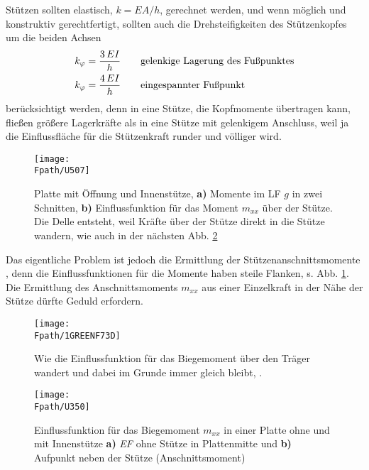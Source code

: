 St\"{u}tzen sollten elastisch, $k = EA/h$, gerechnet werden, und wenn m\"{o}glich und konstruktiv gerechtfertigt, sollten auch die Drehsteifigkeiten des St\"{u}tzenkopfes um die beiden Achsen
\begin{align}
k_\varphi &= \frac{3\,EI}{h}\qquad \mbox{gelenkige Lagerung des Fu{\ss}punktes} \\
k_\varphi &= \frac{4\,EI}{h}\qquad \mbox{eingespannter Fu{\ss}punkt}
\end{align}
ber\"{u}cksichtigt werden, denn in eine St\"{u}tze, die Kopfmomente \"{u}bertragen kann, flie{\ss}en gr\"{o}{\ss}ere Lagerkr\"{a}fte als in eine St\"{u}tze mit gelenkigem Anschluss, weil ja die Einflussfl\"{a}che f\"{u}r die St\"{u}tzenkraft runder und v\"{o}lliger wird.
\begin{figure}[tbp]
\centering
\if {} \sidecaption \fi
\texttt{[image: \\Fpath/U507]}
\caption{Platte mit \"{O}ffnung und Innenst\"{u}tze, \textbf{ a)} Momente im LF $g$ in zwei Schnitten, \textbf{ b)}  Einflussfunktion f\"{u}r das Moment $m_{xx}$ \"{u}ber der St\"{u}tze. Die \glq Delle\grq{} entsteht, weil Kr\"{a}fte \"{u}ber der St\"{u}tze direkt in die St\"{u}tze wandern, wie auch in der n\"{a}chsten Abb. \ref{1GreenF73} } \label{U507}
\end{figure}%

Das eigentliche Problem ist jedoch die Ermittlung der St\"{u}tzenanschnittsmomente , denn die Einflussfunktionen f\"{u}r die Momente haben steile Flanken, s. Abb. \ref{U507}. Die Ermittlung des Anschnittsmoments $m_{xx}$ aus einer Einzelkraft in der N\"{a}he der St\"{u}tze d\"{u}rfte Geduld erfordern.

\begin{figure}[tbp]
\centering
\texttt{[image: \\Fpath/1GREENF73D]}
\caption{Wie die Einflussfunktion f\"{u}r das Biegemoment \"{u}ber den Tr\"{a}ger wandert und dabei im Grunde immer gleich bleibt, \cite{Ha6}.}
\label{1GreenF73}%
\end{figure}%
\begin{figure}
\centering
\if {} \sidecaption[t] \fi
{\texttt{[image: \\Fpath/U350]}}
\caption{Einflussfunktion f\"{u}r das Biegemoment $m_{xx}$ in einer Platte ohne und mit Innenst\"{u}tze \textbf{ a)} {\em EF\/} ohne St\"{u}tze in Plattenmitte  und  \textbf{ b)} Aufpunkt neben der St\"{u}tze (Anschnittsmoment)}
\label{U350}%
\end{figure}%

